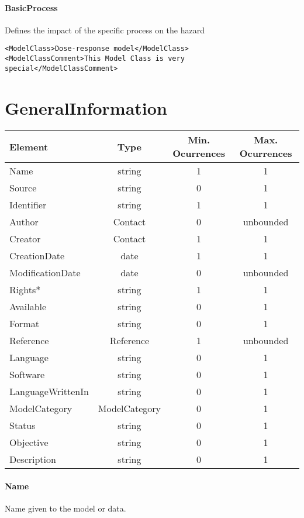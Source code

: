 \documentclass[a4paper]{report}
\begin{document}
\paragraph{BasicProcess}
Defines the impact of the specific process on the hazard

\begin{lstlisting}[basicstyle=\footnotesize, caption={Example of ModelCategory}]
<ModelClass>Dose-response model</ModelClass>
<ModelClassComment>This Model Class is very special</ModelClassComment>
\end{lstlisting} 

\section{GeneralInformation}

\begin{tabular}{|l|c|c|c|}
    \hline
    \textbf{Element} & \textbf{Type} & \textbf{Min. Ocurrences} & \textbf{Max. Ocurrences} \\
    \hline
    Name & string & 1 & 1 \\
    Source & string & 0 & 1\\
    Identifier & string & 1 & 1 \\
    Author & Contact & 0 & unbounded \\
    Creator & Contact & 1 & 1 \\
    CreationDate & date & 1 & 1 \\
    ModificationDate & date & 0 & unbounded \\
    Rights* & string & 1 & 1 \\
    Available & string & 0 & 1 \\
    Format & string & 0 & 1 \\
    Reference & Reference & 1 & unbounded \\
    Language & string & 0 & 1 \\
    Software & string & 0 & 1 \\
    LanguageWrittenIn & string & 0 & 1 \\
    ModelCategory & ModelCategory & 0 & 1 \\
    Status & string & 0 & 1 \\
    Objective & string & 0 & 1 \\
    Description & string & 0 & 1 \\
    \hline
\end{tabular}

\paragraph{Name}
Name given to the model or data.
\end{document}
